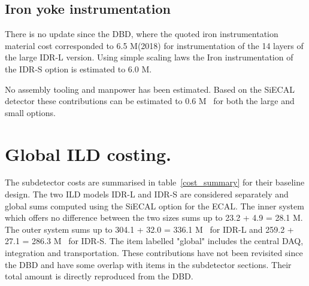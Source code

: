 \subsection{Iron yoke instrumentation}
There is no update since the DBD, where the quoted iron instrumentation material cost corresponded to 6.5 M\texteuro(2018) for instrumentation of the 14 layers of the large IDR-L version. Using simple scaling laws the Iron instrumentation of the IDR-S option is estimated to 6.0 M\texteuro.


No assembly tooling and manpower has been estimated. Based on the SiECAL detector these contributions can be estimated to 0.6 M\texteuro~ for both the large and small options. 

\section{Global ILD costing.}
The subdetector costs are summarised in table~\ref{cost_summary} for their baseline design. The two ILD models IDR-L and IDR-S are considered separately and global sums computed using the SiECAL option for the ECAL.
The inner system which offers no difference between the two sizes sums up to 23.2 + 4.9 = 28.1 M\texteuro. The outer system sums up to 304.1 + 32.0 = 336.1 M\texteuro~ for IDR-L and 259.2 + 27.1 = 286.3 M\texteuro~ for IDR-S.
The item labelled "global" includes the central DAQ, integration and transportation. These contributions have not been revisited since the DBD and have some overlap with items in the subdetector sections. Their total amount is directly reproduced from the DBD.

